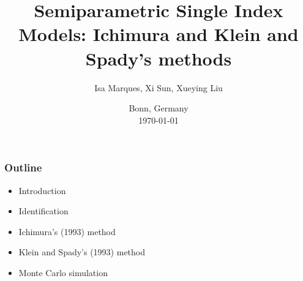\documentclass{beamer}
\title[Ichimura's and Klein and Spady's methods]{Semiparametric Single Index Models: Ichimura and Klein and Spady's methods} %
\begin{document}
\author{Isa Marques, Xi Sun, Xueying Liu} %
{
}

\date{
{\small Bonn, Germany}\\
{\small \today}
}

\begin{frame}
\titlepage %
\end{frame}





\begin{frame}[t]
    \frametitle{Outline}
    
    \begin{itemize}
        \item Introduction
        \item Identification
        \item Ichimura's (1993) method
        \item Klein and Spady's (1993) method
        \item Monte Carlo simulation
    \end{itemize}
    \note{~}
\end{frame}
\end{document}

